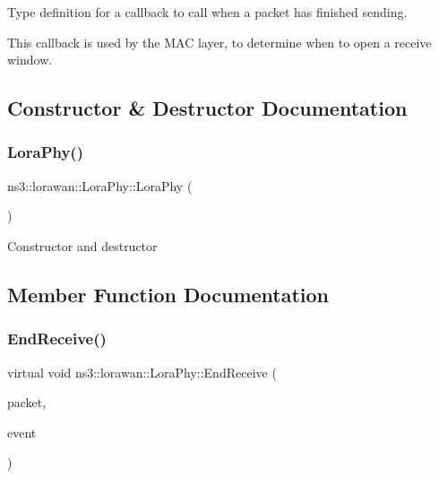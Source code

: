 Type definition for a callback to call when a packet has finished sending.

This callback is used by the M\+AC layer, to determine when to open a receive window. 

\subsection{Constructor \& Destructor Documentation}
\mbox{\label{classns3_1_1lorawan_1_1LoraPhy_ae7fcfd340ea8fcf49e32d02df39555be}} 
\subsubsection{\texorpdfstring{Lora\+Phy()}{LoraPhy()}}
{\footnotesize\ttfamily ns3\+::lorawan\+::\+Lora\+Phy\+::\+Lora\+Phy (\begin{DoxyParamCaption}{ }\end{DoxyParamCaption})}

Constructor and destructor 

\subsection{Member Function Documentation}
\mbox{\label{classns3_1_1lorawan_1_1LoraPhy_a719f749890c247abc3fda290d384c37f}} 
\subsubsection{\texorpdfstring{End\+Receive()}{EndReceive()}}
{\footnotesize\ttfamily virtual void ns3\+::lorawan\+::\+Lora\+Phy\+::\+End\+Receive (\begin{DoxyParamCaption}\item[{Ptr$<$ Packet $>$}]{packet,  }\item[{Ptr$<$ \hyperlink{classns3_1_1lorawan_1_1LoraInterferenceHelper_1_1Event}{Lora\+Interference\+Helper\+::\+Event} $>$}]{event }\end{DoxyParamCaption})\hspace{0.3cm}{\ttfamily [pure virtual]}}

